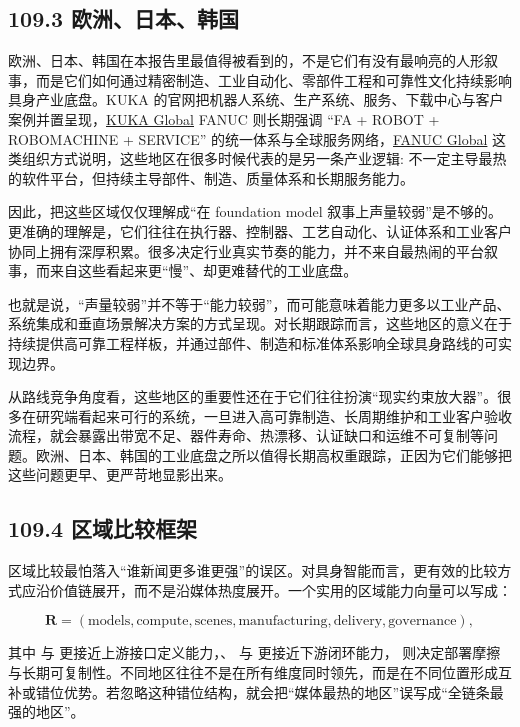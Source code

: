 \subsection*{109.3 欧洲、日本、韩国}


欧洲、日本、韩国在本报告里最值得被看到的，不是它们有没有最响亮的人形叙事，而是它们如何通过精密制造、工业自动化、零部件工程和可靠性文化持续影响具身产业底盘。KUKA 的官网把机器人系统、生产系统、服务、下载中心与客户案例并置呈现，\href{https://www.kuka.com/}{KUKA Global} FANUC 则长期强调 “FA + ROBOT + ROBOMACHINE + SERVICE” 的统一体系与全球服务网络，\href{https://www.fanuc.com/}{FANUC Global} 这类组织方式说明，这些地区在很多时候代表的是另一条产业逻辑: 不一定主导最热的软件平台，但持续主导部件、制造、质量体系和长期服务能力。

因此，把这些区域仅仅理解成“在 foundation model 叙事上声量较弱”是不够的。更准确的理解是，它们往往在执行器、控制器、工艺自动化、认证体系和工业客户协同上拥有深厚积累。很多决定行业真实节奏的能力，并不来自最热闹的平台叙事，而来自这些看起来更“慢”、却更难替代的工业底盘。

也就是说，“声量较弱”并不等于“能力较弱”，而可能意味着能力更多以工业产品、系统集成和垂直场景解决方案的方式呈现。对长期跟踪而言，这些地区的意义在于持续提供高可靠工程样板，并通过部件、制造和标准体系影响全球具身路线的可实现边界。

从路线竞争角度看，这些地区的重要性还在于它们往往扮演“现实约束放大器”。很多在研究端看起来可行的系统，一旦进入高可靠制造、长周期维护和工业客户验收流程，就会暴露出带宽不足、器件寿命、热漂移、认证缺口和运维不可复制等问题。欧洲、日本、韩国的工业底盘之所以值得长期高权重跟踪，正因为它们能够把这些问题更早、更严苛地显影出来。

\subsection*{109.4 区域比较框架}


区域比较最怕落入“谁新闻更多谁更强”的误区。对具身智能而言，更有效的比较方式应沿价值链展开，而不是沿媒体热度展开。一个实用的区域能力向量可以写成：

\begingroup
\scriptsize
\begin{equation*}
\mathbf{R} =
(\text{models}, \text{compute}, \text{scenes}, \text{manufacturing}, \text{delivery}, \text{governance}),
\end{equation*}
\endgroup

其中 \texttt{} 与 \texttt{} 更接近上游接口定义能力，\texttt{}、\texttt{} 与 \texttt{} 更接近下游闭环能力，\texttt{} 则决定部署摩擦与长期可复制性。不同地区往往不是在所有维度同时领先，而是在不同位置形成互补或错位优势。若忽略这种错位结构，就会把“媒体最热的地区”误写成“全链条最强的地区”。

